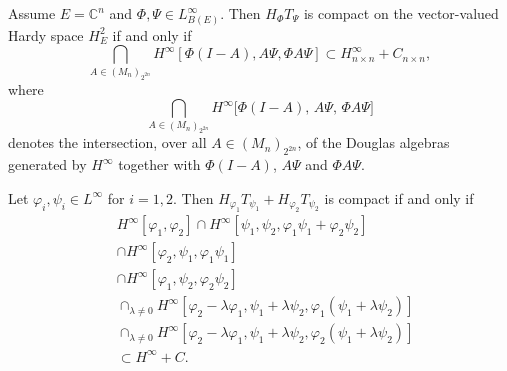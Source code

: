\documentclass[10pt,a4paper]{amsart}
\begin{document}
\begin{theorem}
\label{maina}Assume $E=\mathbb{C}^{n}$ and $\Phi,\Psi\in L_{B(E)}^{\infty}.$
Then $H_{\Phi}T_{\Psi}$ is compact on the vector-valued Hardy space $H_{E}%
^{2}$ if and only if
\[
\bigcap_{A\in\left(  M_{n}\right)  _{2^{2n}}}H^{\infty}\left[  \Phi
(I-A),A\Psi,\Phi A\Psi\right]  \subset H_{n\times n}^{\infty}+C_{n\times n},
\]
where \[
\bigcap_{A \in (M_{n})_{2^{2n}}} 
   H^{\infty}\!\bigl[\Phi(I-A),\, A\Psi,\, \Phi A\Psi\bigr]
\]denotes the intersection, over all $A \in (M_{n})_{2^{2n}}$, 
of the Douglas algebras generated by $H^{\infty}$ together with $\Phi(I-A)$, $A\Psi$ and $\Phi A\Psi$.
\end{theorem}

\begin{corollary}
\label{cor2} Let $\varphi_{i},\psi_{i}\in L^{\infty}$ for $i=1,2.$ Then
$H_{\varphi_{1}}T_{\psi_{1}}+H_{\varphi_{2}}T_{\psi_{2}}$ is compact if and
only if
\begin{align}
&  H^{\infty}\left[  \varphi_{1},\varphi_{2}\right]  \cap H^{\infty}\left[
\psi_{1},\psi_{2},\varphi_{1}\psi_{1}+\varphi_{2}\psi_{2}\right]
\label{line1}\\
&  \cap H^{\infty}\left[  \varphi_{2},\psi_{1},\varphi_{1}\psi_{1}\right]
\label{line-1}\\
&  \cap H^{\infty}\left[  \varphi_{1},\psi_{2},\varphi_{2}\psi_{2}\right]
\label{line0}\\
&  \cap_{\lambda\neq0}H^{\infty}\left[  \varphi_{2}-\lambda\varphi_{1}%
,\psi_{1}+\lambda\psi_{2},\varphi_{1}\left(  \psi_{1}+\lambda\psi_{2}\right)
\right] \label{line2}\\
&  \cap_{\lambda\neq0}H^{\infty}\left[  \varphi_{2}-\lambda\varphi_{1}%
,\psi_{1}+\lambda\psi_{2},\varphi_{2}\left(  \psi_{1}+\lambda\psi_{2}\right)
\right] \label{line3}\\
&  \subset H^{\infty}+C.\nonumber
\end{align}

\end{corollary}
\end{document}
